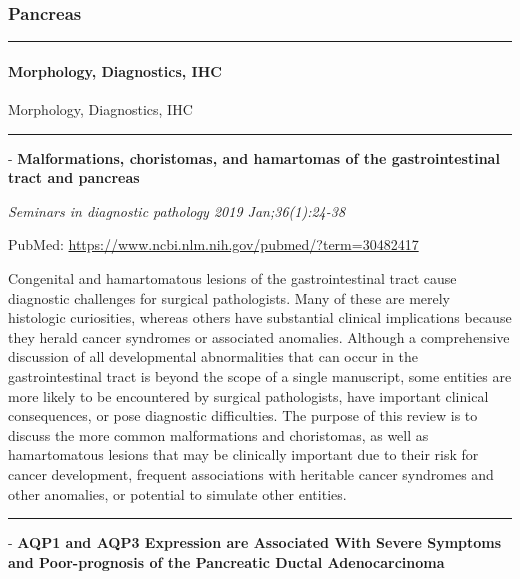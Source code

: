 \documentclass[]{article}
\let\oldparagraph\paragraph
\renewcommand{\paragraph}[1]{\oldparagraph{#1}\mbox{}}
\begin{document}
\hypertarget{pancreas}{%
\subsubsection{Pancreas}\label{pancreas}}

\begin{center}\rule{0.5\linewidth}{\linethickness}\end{center}

\hypertarget{morphology-diagnostics-ihc}{%
\paragraph{Morphology, Diagnostics,
IHC}\label{morphology-diagnostics-ihc}}

Morphology, Diagnostics, IHC

\begin{center}\rule{0.5\linewidth}{\linethickness}\end{center}

 - \textbf{Malformations, choristomas, and hamartomas of the
gastrointestinal tract and pancreas}

\emph{Seminars in diagnostic pathology 2019 Jan;36(1):24-38}

PubMed: \url{https://www.ncbi.nlm.nih.gov/pubmed/?term=30482417}

Congenital and hamartomatous lesions of the gastrointestinal tract cause
diagnostic challenges for surgical pathologists. Many of these are
merely histologic curiosities, whereas others have substantial clinical
implications because they herald cancer syndromes or associated
anomalies. Although a comprehensive discussion of all developmental
abnormalities that can occur in the gastrointestinal tract is beyond the
scope of a single manuscript, some entities are more likely to be
encountered by surgical pathologists, have important clinical
consequences, or pose diagnostic difficulties. The purpose of this
review is to discuss the more common malformations and choristomas, as
well as hamartomatous lesions that may be clinically important due to
their risk for cancer development, frequent associations with heritable
cancer syndromes and other anomalies, or potential to simulate other
entities.

{}

{}

\begin{center}\rule{0.5\linewidth}{\linethickness}\end{center}

 - \textbf{AQP1 and AQP3 Expression are Associated With Severe Symptoms
and Poor-prognosis of the Pancreatic Ductal Adenocarcinoma}
\end{document}
